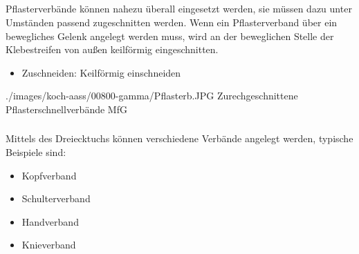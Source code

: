 \subsection{}
\label{topic:wundverbaende}


\subsubsection{}


\TextSlidePicture
{\TxBeschreibung}%
{Pflasterverbände können nahezu überall eingesetzt werden,
sie müssen dazu unter Umständen passend zugeschnitten
werden. Wenn ein Pflasterverband über ein bewegliches
Gelenk angelegt werden muss, wird an der beweglichen Stelle
der Klebestreifen von außen keilförmig eingeschnitten.}%
{%
\begin{itemize}
  \item Zuschneiden: Keilförmig einschneiden
\end{itemize}%
}%
{./images/koch-aass/00800-gamma/Pflasterb.JPG}%
{Zurechgeschnittene Pflasterschnellverbände}%
{}%
{\AASS}%
{MfG}%

\subsubsection{}

Mittels des Dreiecktuchs können verschiedene Verbände
angelegt werden, typische Beispiele sind:

\begin{itemize}
  \item Kopfverband \dotfill
  \item Schulterverband \dotfill
  \item Handverband \dotfill {}
  \item Knieverband \dotfill {}
\end{itemize}




